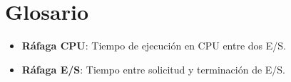\documentclass{article}
\begin{document}

\newpage
\section*{Glosario}
\begin{itemize}
	\item \textbf{Ráfaga CPU}: Tiempo de ejecución en CPU entre dos E/S.
	\item \textbf{Ráfaga E/S}: Tiempo entre solicitud y terminación de E/S.
\end{itemize}


\cite{pag1, intef, jaume, Silberschatz}

\newpage



\end{document}
